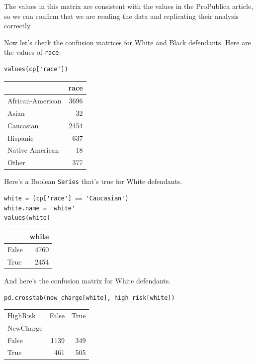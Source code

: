 The values in this matrix are consistent with the values in the
ProPublica article, so we can confirm that we are reading the data and
replicating their analysis correctly.

Now let's check the confusion matrices for White and Black defendants.
Here are the values of \passthrough{\lstinline!race!}:

\begin{lstlisting}[]
values(cp['race'])
\end{lstlisting}

\begin{tabular}{lr}
\midrule
{} &  race \\
\midrule
African-American &  3696 \\
Asian            &    32 \\
Caucasian        &  2454 \\
Hispanic         &   637 \\
Native American  &    18 \\
Other            &   377 \\
\midrule
\end{tabular}

Here's a Boolean \passthrough{\lstinline!Series!} that's true for White
defendants.

\begin{lstlisting}[]
white = (cp['race'] == 'Caucasian')
white.name = 'white'
values(white)
\end{lstlisting}

\begin{tabular}{lr}
\midrule
{} &  white \\
\midrule
False &   4760 \\
True  &   2454 \\
\midrule
\end{tabular}

And here's the confusion matrix for White defendants.

\begin{lstlisting}[]
pd.crosstab(new_charge[white], high_risk[white])
\end{lstlisting}

\begin{tabular}{lrr}
\midrule
HighRisk &  False &  True  \\
NewCharge &        &        \\
\midrule
False     &   1139 &    349 \\
True      &    461 &    505 \\
\midrule
\end{tabular}

